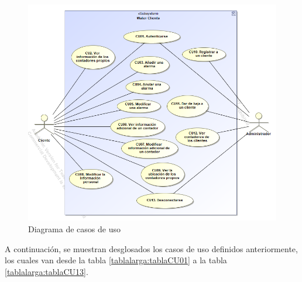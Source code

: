 \documentclass[pdftex,11pt,a4paper]{book}
\begin{document}
 \begin{figure}[H]
 \centering
 \includegraphics [scale=0.75] {images/diagramas/diagramaCU.png}
 \caption{Diagrama de casos de uso} \label{fig:diagrama-cu}
 \end{figure}

\vspace{1,5cm}

A continuación, se muestran desglosados los casos de uso definidos anteriormente, los cuales van desde la tabla \ref{tablalarga:tablaCU01} a la tabla \ref{tablalarga:tablaCU13}.



\renewcommand{\tablename}{Tabla}
\renewcommand{\arraystretch}{1,7}
\end{document}
